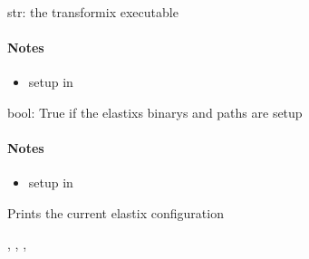\documentclass[letterpaper,10pt,english]{sphinxmanual}
\begin{document}

\begin{fulllineitems}
\label{api/ClearMap.Alignment:ClearMap.Alignment.Elastix.TransformixBinary}
str: the transformix executable
\paragraph{Notes}
\begin{itemize}
\item {} 
setup in {\hyperref[api/ClearMap.Alignment:ClearMap.Alignment.Elastix.initializeElastix]{\emph{}}}

\end{itemize}

\end{fulllineitems}


\begin{fulllineitems}
\label{api/ClearMap.Alignment:ClearMap.Alignment.Elastix.Initialized}
bool: True if the elastixs binarys and paths are setup
\paragraph{Notes}
\begin{itemize}
\item {} 
setup in {\hyperref[api/ClearMap.Alignment:ClearMap.Alignment.Elastix.initializeElastix]{\emph{}}}

\end{itemize}

\end{fulllineitems}


\begin{fulllineitems}
\label{api/ClearMap.Alignment:ClearMap.Alignment.Elastix.printSettings}
Prints the current elastix configuration




{\hyperref[api/ClearMap.Alignment:ClearMap.Alignment.Elastix.ElastixBinary]{\emph{}}}, {\hyperref[api/ClearMap.Alignment:ClearMap.Alignment.Elastix.ElastixLib]{\emph{}}}, {\hyperref[api/ClearMap.Alignment:ClearMap.Alignment.Elastix.TransformixBinary]{\emph{}}}, {\hyperref[api/ClearMap.Alignment:ClearMap.Alignment.Elastix.Initialized]{\emph{}}}



\end{fulllineitems}
\end{document}
